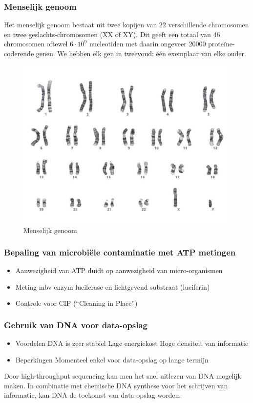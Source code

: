 \documentclass[a4paper,kul]{kulakarticle} %
\begin{document}
\subsubsection{Menselijk genoom}
Het menselijk genoom bestaat uit twee kopijen van 22 verschillende chromosomen en twee geslachts-chromosomen (XX of XY). Dit geeft een totaal van 46 chromosomen oftewel $6\cdot10^9$ nucleotiden met daarin ongeveer \num{20000} proteïne-coderende genen. We hebben elk gen in tweevoud: één exemplaar van elke ouder.
\begin{figure}[h]
	\centering
	\includegraphics[width=0.7\linewidth]{MenselijkGenoom}
	\caption[Menselijk genoom]{Menselijk genoom}
	\label{fig:menselijkgenoom}
\end{figure}

\subsubsection{Bepaling van microbiële contaminatie met ATP metingen}
\begin{itemize}
	\item Aanwezigheid van ATP duidt op aanwezigheid van micro-organismen
	\item Meting mbv enzym luciferase en lichtgevend substraat (luciferin)
	\item Controle voor CIP (“Cleaning in Place”)
\end{itemize}
\subsubsection{Gebruik van DNA voor data-opslag}
\begin{itemize}
	\item Voordelen
	\subitem DNA is zeer stabiel
	\subitem Lage energiekost 
	\subitem Hoge densiteit van informatie
	\item Beperkingen
	\subitem Momenteel enkel voor data-opslag op lange termijn
\end{itemize}
Door high-throughput sequencing kan men het snel uitlezen van DNA mogelijk maken. In combinatie met chemische DNA synthese voor het schrijven van informatie, kan DNA de toekomst van data-opslag worden. 
\end{document}

